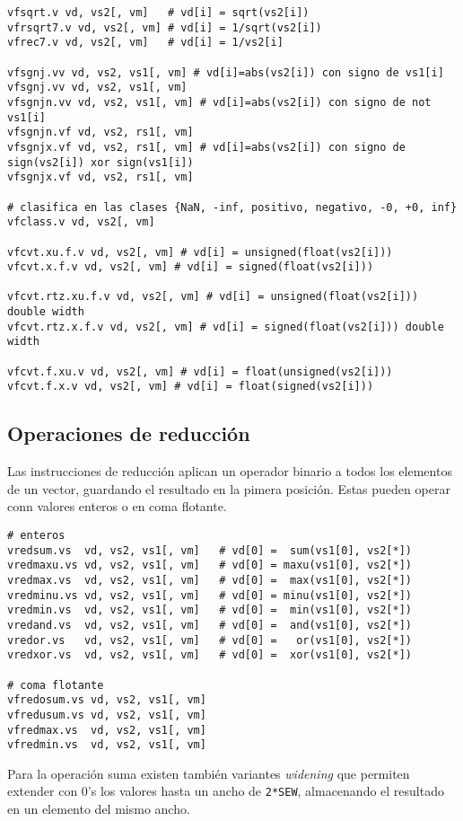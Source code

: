\begin{lstlisting}
vfsqrt.v vd, vs2[, vm]   # vd[i] = sqrt(vs2[i])
vfrsqrt7.v vd, vs2[, vm] # vd[i] = 1/sqrt(vs2[i])
vfrec7.v vd, vs2[, vm]   # vd[i] = 1/vs2[i]

vfsgnj.vv vd, vs2, vs1[, vm] # vd[i]=abs(vs2[i]) con signo de vs1[i]
vfsgnj.vv vd, vs2, vs1[, vm]
vfsgnjn.vv vd, vs2, vs1[, vm] # vd[i]=abs(vs2[i]) con signo de not vs1[i]
vfsgnjn.vf vd, vs2, rs1[, vm]
vfsgnjx.vf vd, vs2, rs1[, vm] # vd[i]=abs(vs2[i]) con signo de sign(vs2[i]) xor sign(vs1[i])
vfsgnjx.vf vd, vs2, rs1[, vm]

# clasifica en las clases {NaN, -inf, positivo, negativo, -0, +0, inf}
vfclass.v vd, vs2[, vm] 

vfcvt.xu.f.v vd, vs2[, vm] # vd[i] = unsigned(float(vs2[i]))
vfcvt.x.f.v vd, vs2[, vm] # vd[i] = signed(float(vs2[i]))

vfcvt.rtz.xu.f.v vd, vs2[, vm] # vd[i] = unsigned(float(vs2[i])) double width
vfcvt.rtz.x.f.v vd, vs2[, vm] # vd[i] = signed(float(vs2[i])) double width

vfcvt.f.xu.v vd, vs2[, vm] # vd[i] = float(unsigned(vs2[i]))
vfcvt.f.x.v vd, vs2[, vm] # vd[i] = float(signed(vs2[i]))
\end{lstlisting}

\subsection{Operaciones de reducción}
Las instrucciones de reducción aplican un operador binario a todos los elementos de un vector, guardando el resultado en la pimera posición. Estas pueden operar conn valores enteros o en coma flotante.

\begin{lstlisting}
# enteros
vredsum.vs  vd, vs2, vs1[, vm]   # vd[0] =  sum(vs1[0], vs2[*])
vredmaxu.vs vd, vs2, vs1[, vm]   # vd[0] = maxu(vs1[0], vs2[*])
vredmax.vs  vd, vs2, vs1[, vm]   # vd[0] =  max(vs1[0], vs2[*])
vredminu.vs vd, vs2, vs1[, vm]   # vd[0] = minu(vs1[0], vs2[*])
vredmin.vs  vd, vs2, vs1[, vm]   # vd[0] =  min(vs1[0], vs2[*])
vredand.vs  vd, vs2, vs1[, vm]   # vd[0] =  and(vs1[0], vs2[*])
vredor.vs   vd, vs2, vs1[, vm]   # vd[0] =   or(vs1[0], vs2[*])
vredxor.vs  vd, vs2, vs1[, vm]   # vd[0] =  xor(vs1[0], vs2[*])

# coma flotante
vfredosum.vs vd, vs2, vs1[, vm]
vfredusum.vs vd, vs2, vs1[, vm]
vfredmax.vs  vd, vs2, vs1[, vm]
vfredmin.vs  vd, vs2, vs1[, vm]
\end{lstlisting}
Para la operación suma existen también variantes \textit{widening} que permiten
extender con 0's los valores hasta un ancho de \texttt{2*SEW}, almacenando el
resultado en un elemento del mismo ancho.

